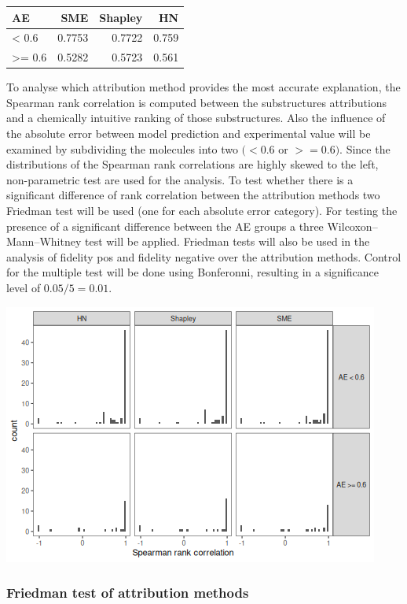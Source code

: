 \documentclass[
  12pt,
  a4paper]{article}
\author{}
\date{\vspace{-2.5em}}
\begin{document}
\begin{longtable}[]{@{}lrrr@{}}
\toprule\noalign{}
AE & SME & Shapley & HN \\
\midrule\noalign{}
\endhead
\bottomrule\noalign{}
\endlastfoot
\textless{} 0.6 & 0.7753 & 0.7722 & 0.759 \\
\textgreater= 0.6 & 0.5282 & 0.5723 & 0.561 \\
\end{longtable}

To analyse which attribution method provides the most accurate
explanation, the Spearman rank correlation is computed between the
substructures attributions and a chemically intuitive ranking of those
substructures. Also the influence of the absolute error between model
prediction and experimental value will be examined by subdividing the
molecules into two \((<0.6\) or \(>=0.6)\). Since the distributions of
the Spearman rank correlations are highly skewed to the left,
non-parametric test are used for the analysis. To test whether there is
a significant difference of rank correlation between the attribution
methods two Friedman test will be used (one for each absolute error
category). For testing the presence of a significant difference between
the AE groups a three Wilcoxon--Mann--Whitney test will be applied.
Friedman tests will also be used in the analysis of fidelity pos and
fidelity negative over the attribution methods. Control for the multiple
test will be done using Bonferonni, resulting in a significance level of
\(0.05/5 = 0.01\).

\includegraphics{statistical_test_files/figure-latex/distributions-1.png}

\newpage

\hypertarget{friedman-test-of-attribution-methods}{%
\subsubsection{Friedman test of attribution
methods}\label{friedman-test-of-attribution-methods}}
\end{document}
